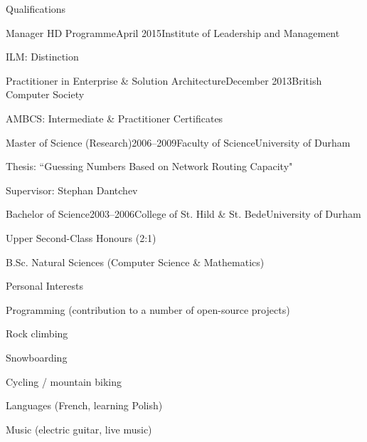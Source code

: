 \documentclass{cv}
\begin{document}

\begin{rSection}{Qualifications}

\begin{rSubsection}{Manager HD Programme}{April 2015}{Institute of Leadership and Management}{}
\item ILM: Distinction
\end{rSubsection}

\begin{rSubsection}{Practitioner in Enterprise \& Solution Architecture}{December 2013}{British Computer Society}{}
\item AMBCS: Intermediate \& Practitioner Certificates
\end{rSubsection}

\begin{rSubsection}{Master of Science (Research)}{2006--2009}{Faculty of Science}{University of Durham}
\item Thesis: ``Guessing Numbers Based on Network Routing Capacity"
\item Supervisor: Stephan Dantchev
\end{rSubsection}

\begin{rSubsection}{Bachelor of Science}{2003--2006}{College of St. Hild \& St. Bede}{University of Durham}
\item Upper Second-Class Honours (2:1)
\item B.Sc. Natural Sciences (Computer Science \& Mathematics)
\end{rSubsection}

\end{rSection}


\begin{rSection}{Personal Interests}

\begin{rSubsection}{}{}{}{}
\item Programming (contribution to a number of open-source projects)
\item Rock climbing
\item Snowboarding
\item Cycling / mountain biking
\item Languages (French, learning Polish)
\item Music (electric guitar, live music)
\end{rSubsection}

\end{rSection}

\end{document}
